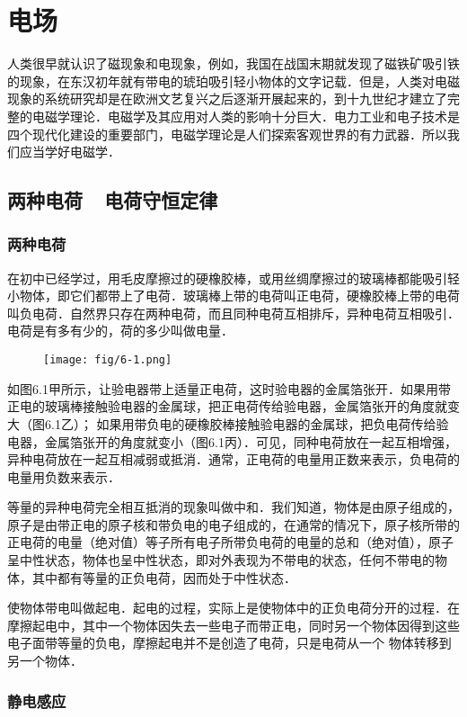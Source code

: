 

\chapter{电场}
人类很早就认识了磁现象和电现象，例如，我国在战国末期就发现了磁铁矿吸引铁的现象，在东汉初年就有带电的琥珀吸引轻小物体的文字记载．但是，人类对电磁现象的系统研究却是在欧洲文艺复兴之后逐渐开展起来的，到十九世纪才建立了完整的电磁学理论．电磁学及其应用对人类的影响十分巨大．电力工业和电子技术是四个现代化建设的重要部门，电磁学理论是人们探索客观世界的有力武器．所以我们应当学好电磁学．

\section{两种电荷~~电荷守恒定律}
\subsection{两种电荷} 
在初中已经学过，用毛皮摩擦过的硬橡胶棒，或用丝绸摩擦过的玻璃棒都能吸引轻小物体，即它们都带上了电荷．玻璃棒上带的电荷叫正电荷，硬橡胶棒上带的电荷叫负电荷．自然界只存在两种电荷，而且同种电荷互相排斥，异种电荷互相吸引．电荷是有多有少的，荷的多少叫做电量．
\begin{figure}[htp]\centering
	\texttt{[image: fig/6-1.png]}
	\caption{}
	\end{figure}

如图6.1甲所示，让验电器带上适量正电荷，这时验电器的金属箔张开．如果用带正电的玻璃棒接触验电器的金属球，把正电荷传给验电器，金属箔张开的角度就变大（图6.1乙）；
如果用带负电的硬橡胶棒接触验电器的金属球，把负电荷传给验电器，金属箔张开的角度就变小（图6.1丙）．可见，同种电荷放在一起互相增强，异种电荷放在一起互相减弱或抵消．通常，正电荷的电量用正数来表示，负电荷的电量用负数来表示．

等量的异种电荷完全相互抵消的现象叫做中和．我们知道，物体是由原子组成的，原子是由带正电的原子核和带负电的电子组成的，在通常的情况下，原子核所带的正电荷的电量（绝对值）等子所有电子所带负电荷的电量的总和（绝对值），原子呈中性状态，物体也呈中性状态，即对外表现为不带电的状态，任何不带电的物体，其中都有等量的正负电荷，因而处于中性状态．

使物体带电叫做起电．起电的过程，实际上是使物体中的正负电荷分开的过程．在摩擦起电中，其中一个物体因失去一些电子而带正电，同时另一个物体因得到这些电子面带等量的负电，摩擦起电并不是创造了电荷，只是电荷从一个
物体转移到另一个物体．

\subsection{静电感应} 

